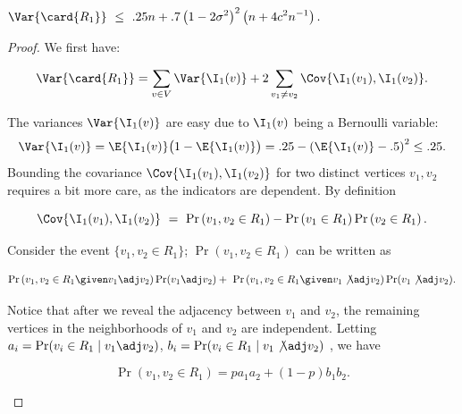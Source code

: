 \documentclass{toc}
\begin{document}
			
			\begin{claim} \label{claim:day-1-covariance}
				$ \displaystyle
				\Var{\card{R_1}} \ \le \ .25n + .7\left(1 - 2\sigma^2\right)^2 \left(n + 4c^2n^{-1}\right).
				$
			\end{claim}
			
			\begin{proof}
				We first have:
				\begin{linenomath}\begin{equation*}
						\Var{\card{R_1}} = \sum_{v\in V}\Var{\I_1(v)} + 2\sum_{v_1\neq v_2}\Cov{\I_1(v_1), \I_1(v_2)}.
				\end{equation*}\end{linenomath}
				\noindent The variances $\Var{\I_1(v)}$ are easy due to $\I_1(v)$ being a  Bernoulli variable:
				\begin{equation} \label{eq:day-1-variance}
					\Var{\I_1(v)} = \E{\I_1(v)}\bigl(1 - \E{\I_1(v)}\bigr) = .25 - \left(\E{\I_1(v)} - .5\right)^2
					\le .25.
				\end{equation}
				Bounding the covariance $\Cov{\I_1(v_1), \I_1(v_2)}$ for two distinct vertices $v_1, v_2$ requires a bit more care, as the indicators are dependent.
				By definition
				\begin{linenomath}\begin{equation*}
						\Cov{\I_1(v_1), \I_1(v_2)} \ = \ \Pr\left(v_1, v_2 \in R_1\right) - \Pr\left(v_1 \in R_1\right) \Pr\left(v_2 \in R_1\right).
				\end{equation*}\end{linenomath}
				Consider the event $\{v_1, v_2 \in R_1\}$;  $\Pr\left(v_1, v_2 \in R_1\right)$ can be written as
				\begin{linenomath}\begin{equation*}
						\Pr\left(v_1, v_2 \in R_1 \given v_1 \adj v_2\right)\Pr(v_1 \adj v_2) + \ \Pr\left(v_1, v_2 \in R_1 \given v_1 \not\adj v_2\right)\Pr(v_1 \not\adj v_2).
				\end{equation*}\end{linenomath}
				Notice  that after we reveal the adjacency between $v_1$ and $v_2$, the remaining vertices in the neighborhoods of $v_1$ and $v_2$ are independent. Letting $a_i = \Pr(v_i\in R_1\mid v_1\adj v_2)$, $b_i = \Pr(v_i\in R_1\mid v_1\not\adj v_2)$ %
				, we have
				\begin{linenomath}\begin{equation*}
						\Pr\left(v_1, v_2 \in R_1\right) =  pa_1a_2 + (1 - p)b_1b_2.

\end{equation*}
\end{linenomath}
\end{proof}
\end{document}
